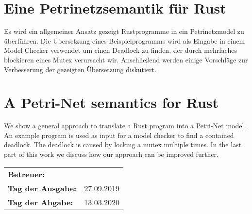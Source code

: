 \section*{Eine Petrinetzsemantik für Rust}
Es wird ein allgemeiner Ansatz gezeigt Rustprogramme in ein Petrinetzmodel zu überführen.
Die Übersetzung eines Beispielprogramms wird als Eingabe in einem Model-Checker verwendet um einen Deadlock zu finden, der durch mehrfaches blockieren eines Mutex verursacht wir.
Anschließend werden einige Vorschläge zur Verbesserung der gezeigten Übersetzung diskutiert.

\section*{A Petri-Net semantics for Rust}
We show a general approach to translate a Rust program into a Petri-Net model.
An example program is used as input for a model checker to find a contained deadlock.
The deadlock is caused by locking a mutex multiple times.
In the last part of this work we discuss how our approach can be improved further.

\vfill

\begin{tabular}{ll}
	\bfseries Betreuer: & \parbox[t]{10cm}{\betreuer }\vspace{5mm} \\
	\bfseries Tag der Ausgabe: & 27.09.2019 \\
	\bfseries Tag der Abgabe: & 13.03.2020 \\
\end{tabular}

